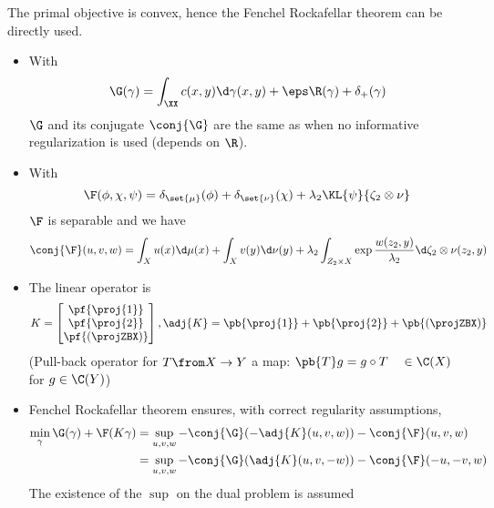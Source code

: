 \documentclass[11pt,a4paper]{article}
\begin{document}
The primal objective is convex, hence the Fenchel Rockafellar theorem can be directly used.
\begin{itemize}
    \item With \begin{equation}\G(\gamma) = \int_{\XX} c(x,y) \d \gamma(x,y) + \eps
        \R(\gamma) + \delta_{+}(\gamma)\end{equation}
        $\G$ and its conjugate
        $\conj{\G}$ are the same as when no informative regularization is used (depends on $\R$).

    \item
        With
        \begin{equation}
            \F(\phi, \chi, \psi) = \delta_{\set{\mu}}(\phi) + \delta_{\set{\nu}}(\chi) + \lambda_2 \KL{\psi}{\zeta_2 \otimes \nu}
        \end{equation}
        $\F$ is separable and we have
        \begin{equation}
            \conj{\F}(u, v, w) = \int_{X}u(x) \d \mu(x) + \int_{X} v(y) \d \nu(y) + \lambda_2 \int_{Z_2 \times X} \exp{\frac{w(z_2,y)}{\lambda_2}}\d \zeta_2 \otimes \nu (z_2, y)
        \end{equation}

    \item The linear operator is
        \begin{equation}
            K = \begin{bmatrix}
                \pf{\proj{1}} \\
                \pf{\proj{2}} \\
                \pf{(\projZBX)}
            \end{bmatrix},
            \adj{K} = \pb{\proj{1}} + \pb{\proj{2}} + \pb{(\projZBX)}
        \end{equation}
        (Pull-back operator for $T\from X \to Y$ a map: $\pb{T}g = g \circ T \quad \in \C(X)$ for $g \in \C(Y)$)

    \item
        Fenchel Rockafellar theorem ensures, with correct regularity assumptions,
        \begin{align}
            \min_{\gamma} \G(\gamma) + \F(K\gamma) &= \sup_{u, v, w} - \conj{\G}(-\adj{K}(u, v, w)) - \conj{\F}(u, v, w)\\
                                                   &= \sup_{u, v, w} - \conj{\G}(\adj{K}(u, v, -w)) - \conj{\F}(-u, -v, w)\\
        \end{align}
        The existence of the $\sup$ on the dual problem is assumed
\end{itemize}
\end{document}
